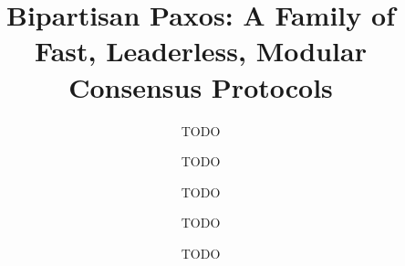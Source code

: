 \documentclass[sigconf, 11pt, nonacm, anonymous]{acmart}
\begin{document}
\title{Bipartisan Paxos: A Family of Fast, Leaderless, Modular Consensus Protocols}

\author{TODO}

\author{TODO}

\author{TODO}

\author{TODO}

\author{TODO}

\renewcommand{\shortauthors}{TODO, et al.}

{}

\maketitle

{}
{}
{}
{}
{}
{}
{}
{}


\renewcommand*{\bibfont}{}


\appendix

{}
{}
{}
{}
\end{document}
